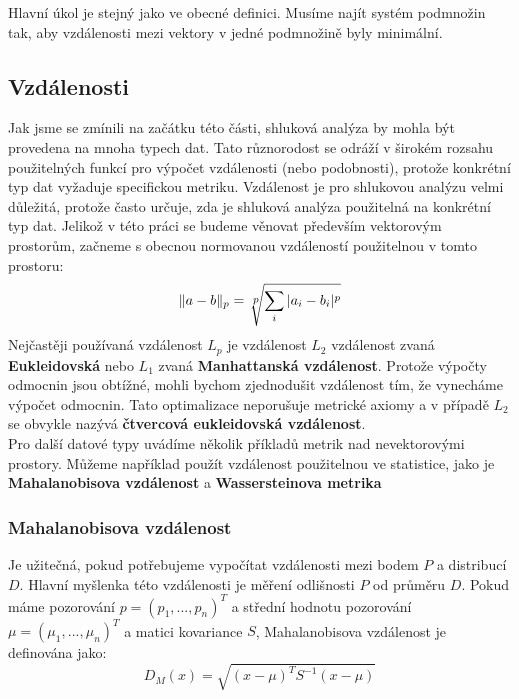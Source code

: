 Hlavní úkol je stejný jako ve obecné definici. Musíme najít systém podmnožin tak, aby vzdálenosti mezi vektory v jedné podmnožině byly minimální.

\subsection{Vzdálenosti}
Jak jsme se zmínili na začátku této části, shluková analýza by mohla být provedena na mnoha typech dat. Tato různorodost se odráží v širokém rozsahu použitelných funkcí pro výpočet vzdálenosti (nebo podobnosti), protože konkrétní typ dat vyžaduje specifickou metriku. Vzdálenost je pro shlukovou analýzu velmi důležitá, protože často určuje, zda je shluková analýza použitelná na konkrétní typ dat. Jelikož v této práci se budeme věnovat především vektorovým prostorům, začneme s obecnou normovanou vzdáleností použitelnou v tomto prostoru: $$\|a-b\|_p=\sqrt[\leftroot{-1}\uproot{3}\scriptstyle p]{\sum_i |a_i - b_i|^p} $$
Nejčastěji používaná vzdálenost $L_p$ je vzdálenost $L_2$ vzdálenost zvaná \textbf {Eukleidovská} nebo $L_1$ zvaná \textbf {Manhattanská vzdá\-le\-nost}.
Protože výpočty odmocnin jsou obtížné, mohli bychom zjednodušit vzdálenost tím, že vynecháme výpočet odmocnin. Tato optimalizace neporušuje metrické axiomy a v případě $L_2$ se obvykle nazývá \textbf {čtvercová eukleidovská vzdálenost}.\\

Pro další datové typy uvádíme několik příkladů metrik nad nevektorovými prostory. Můžeme například použít vzdálenost použitelnou ve statistice, jako je \textbf{Mahalanobisova vzdálenost} a \textbf{Wassersteinova metrika}

\subsubsection{Mahalanobisova vzdálenost}
Je užitečná, pokud potřebujeme vypočítat vzdálenosti mezi bodem $ P$ a distribucí $D$. Hlavní myšlenka této vzdálenosti je měření odlišnosti $P$ od průměru $D$.
Pokud máme pozorování $p = (p_1,..., p_n)^T$ a střední hodnotu pozorování $\mu=(\mu_1,...,\mu_n)^T $ a matici kovariance $S$, Mahalanobisova vzdálenost je definována jako:
$$D_M(x) = \sqrt{(x - \mu)^T S^{-1} (x-\mu)}$$

